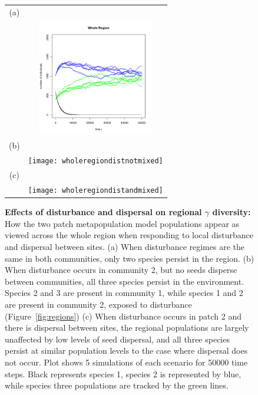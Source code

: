 \begin{figure}[htbp]
\begin{center}
\begin{tabular}{cc}
(a)&\\
&\includegraphics[width=2in]{wholeregionnodist} \\
(b)&\\
&\texttt{[image: wholeregiondistnotmixed]} \\
(c)&\\
&\texttt{[image: wholeregiondistandmixed]} 
\end{tabular}
\caption[Effects of disturbance and dispersal on regional $\gamma$ diversity]{\textbf{Effects of disturbance and dispersal on regional $\gamma$ diversity:} How the two patch metapopulation model populations appear as viewed across the whole region when responding to local disturbance and dispersal between sites. (a) When disturbance regimes are the same in both communities, only two species persist in the region. (b) When disturbance occurs in community 2, but no seeds disperse between communities, all three species persist in the environment. Species 2 and 3 are present in community 1, while species 1 and 2 are present in community 2, exposed to disturbance (Figure~\ref{fig:regions}) (c) When disturbance occurs in patch 2 and there is dispersal between sites, the regional populations are largely unaffected by low levels of seed dispersal, and all three species persist at similar population levels to the case where dispersal does not occur. Plot shows 5 simulations of each scenario for 50000 time steps. Black represents species 1, species 2 is represented by blue, while species three populations are tracked by the green lines.}
\label{wholereg}
\end{center}
\end{figure}


